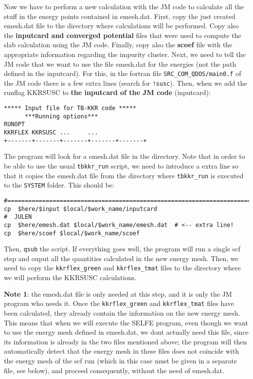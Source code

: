 \documentclass[a4paper,10pt,fullpage]{report}
\begin{document}
\begin{itemize}
Now we have to perform a new calculation with the JM code to calculate
all the stuff in the energy points contained in emesh.dat. 
First, copy the just created emesh.dat file to the directory where calculations will
be performed. Copy also the \textbf{inputcard and converged potential} files  
that were used to compute the slab calculation using the JM code.
Finally, copy also the \textbf{scoef} file with the appropriate
information regarding the impurity cluster.
Next, we need to tell the JM code that we want to use the file emesh.dat for
the energies (not the path defined in the inputcard).
For this, in the fortran file \verb|SRC_COM_QDOS/main0.f| of the JM code
there is a few extra lines (search for \verb|!susc|).
Then, when we add the runflag KKRSUSC to \textbf{the inputcard of the JM code}
(inputcard):
\begin{verbatim}
***** Input file for TB-KKR code *****
      ***Running options***
RUNOPT
KKRFLEX KKRSUSC ...     ...
+-------+-------+-------+-------+-------+
\end{verbatim}
The program will look for a emesh.dat file in the directory. 
Note that in order to be able to use the usual \verb|tbkkr_run|
script, we need to introduce a extra line so that it copies the emesh.dat
file from the directory where \verb|tbkkr_run| is executed to the \verb|SYSTEM| 
folder. This should be:
\begin{verbatim}
#=======================================================================
cp  $here/$input $local/$work_name/inputcard
#  JULEN
cp  $here/emesh.dat $local/$work_name/emesh.dat  # <-- extra line!
cp  $here/scoef $local/$work_name/scoef
\end{verbatim}
Then, \verb|qsub| the script. If everything goes well,
the program will run a single scf step and ouput all the quantities
calculated in the new energy mesh. Then, we need to copy the 
\verb|kkrflex_green| and \verb|kkrflex_tmat| files to the
directory where we will perform the KKRSUSC calculations.

\textbf{Note 1}: the emesh.dat file is only needed at this step, and it is only
the JM program who needs it. Once the \verb|kkrflex_green| and \verb|kkrflex_tmat| files
have been calculated, they already contain the information on the new energy mesh.
This means that when we will execute the SELFE  program, even though we want to
use the energy mesh defined in emesh.dat, we dont actually need this file,
since its information is already in the two files mentioned above; the program
will then automatically detect that the energy mesh in these files does not coincide
with the energy mesh of the scf run (which in this case must be given in a separate
file, see below), and proceed consequently, without the need of emesh.dat.


\end{itemize}
\end{document}
